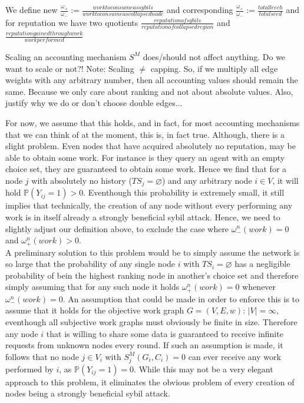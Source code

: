 \documentclass[11pt,a4paper]{report}
\theoremstyle{definition}
\theoremstyle{theorem}
\theoremstyle{proposition}
\theoremstyle{corollary}
\theoremstyle{lemma}
\theoremstyle{example}
\theoremstyle{remark}
\begin{document}
\begin{center}
We define new $\frac{\omega_{+}}{\omega_{-}}:=\frac{work to consume as sybils}{work to consume as collapsed node}$ and corresponding $\frac{\omega_{+}}{\omega_{-}}:=\frac{total leech}{total seed}$ and for reputation we have two quotients $\frac{reputation of sybils}{reputation of collapsed region}$ and $\frac{reputation gained through work}{work performed}$
\end{center}



\begin{center}
Scaling an accounting mechanism $S^M$ does/should not affect anything. Do we want to scale or not?! Note: Scaling $\neq$ capping. So, if we multiply all edge weights with any arbitrary number, then all accounting values should remain the same. Because we only care about ranking and not about absolute values. Also, justify why we do or don't choose double edges...
\end{center}

\noindent{}For now, we assume that this holds, and in fact, for most accounting mechanisms that we can think of at the moment, this is, in fact true. Although, there is a slight problem. Even nodes that have acquired absolutely no reputation, may be able to obtain some work. For instance is they query an agent with an empty choice set, they are guaranteed to obtain some work. Hence we find that for a node $j$ with absolutely no history ($TS_j = \varnothing$) and any arbitrary node $i\in{}V$, it will hold $\mathbb{P}(Y_{ij}=1)>0$. Eventhough this probability is extremely small, it still implies that technically, the creation of any node without every performing any work is in itself   already a strongly beneficial sybil attack. Hence, we need to slightly adjust our definition above, to exclude the case where $\omega^n_{-}(work)=0$ and $\omega^n_{+}(work)>0$. \vspace{1em}\\

\noindent{}A preliminary solution to this problem would be to simply assume the network is so large that the probability of any single node $i$ with $TS_i=\varnothing$ has a negligible probability of bein the highest ranking node in another's choice set and therefore simply assuming that for any such node it holds $\omega^n_{+}(work)=0$ whenever $\omega^n_{-}(work)=0$. An assumption that could be made in order to enforce this is to assume that it holds for the objective work graph $G=(V,E,w)$: $|V|=\infty$, eventhough all subjective work graphs must obviously be finite in size. Therefore any node $i$ that is willing to share some data is guaranteed to receive infinite requests from unknown nodes every round. If such an assumption is made, it follows that no node $j\in{}V_i$ with $S^M_j(G_i,C_i)=0$ can ever receive any work performed by $i$, as $\mathbb{P}(Y_{ij}=1)=0$. While this may not be a very elegant approach to this problem, it eliminates the obvious problem of every creation of nodes being a strongly beneficial sybil attack. \vspace{1em}\\
\end{document}
